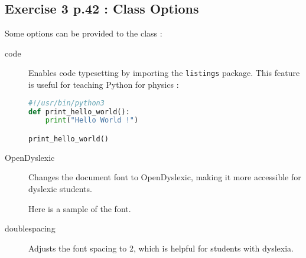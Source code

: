 \documentclass[code]{HSP-AnswerSheet}
\begin{document}
\begin{multicols*}{2}
		\subsection*{Exercise 3 p.42 : Class Options}
		Some options can be provided to the class :
		\begin{description}
			\item[code] Enables code typesetting by importing the \verb|listings| package. This feature is useful for teaching Python for physics :
			\begin{lstlisting}[language=Python]
#!/usr/bin/python3
def print_hello_world():
	print("Hello World !")

print_hello_world()
			\end{lstlisting}
		\item[OpenDyslexic] Changes the document font to OpenDyslexic, making it more accessible for dyslexic students.
		
		{ Here is a sample of the font.}
		
		\item[doublespacing] Adjusts the font spacing to 2, which is helpful for students with dyslexia.
		\end{description}
		
	\end{multicols*}
\end{document}
